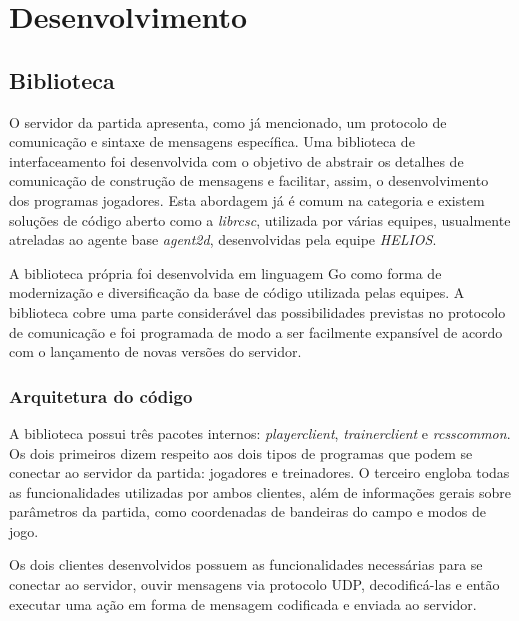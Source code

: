 \chapter{Desenvolvimento \label{chap:Desenvolvimento}}




\section{Biblioteca} \label{sec:lib}

O servidor da partida apresenta, como já mencionado, um protocolo de comunicação e sintaxe de mensagens específica. Uma biblioteca de interfaceamento foi desenvolvida com o objetivo de abstrair os detalhes de comunicação de construção de mensagens e facilitar, assim, o desenvolvimento dos programas jogadores. Esta abordagem já é comum na categoria e existem soluções de código aberto como a \textit{librcsc}, utilizada por várias equipes, usualmente atreladas ao agente base \textit{agent2d}, desenvolvidas pela equipe \textit{HELIOS}.

A biblioteca própria foi desenvolvida em linguagem Go como forma de modernização e diversificação da base de código utilizada pelas equipes. A biblioteca cobre uma parte considerável das possibilidades previstas no protocolo de comunicação e foi programada de modo a ser facilmente expansível de acordo com o lançamento de novas versões do servidor.

\subsection{Arquitetura do código}
A biblioteca possui três pacotes internos: \textit{playerclient}, \textit{trainerclient} e \textit{rcsscommon}. Os dois primeiros dizem respeito aos dois tipos de programas que podem se conectar ao servidor da partida: jogadores e treinadores. O terceiro engloba todas as funcionalidades utilizadas por ambos clientes, além de informações gerais sobre parâmetros da partida, como coordenadas de bandeiras do campo e modos de jogo.

Os dois clientes desenvolvidos possuem as funcionalidades necessárias para se conectar ao servidor, ouvir mensagens via protocolo UDP, decodificá-las e então executar uma ação em forma de mensagem codificada e enviada ao servidor.

